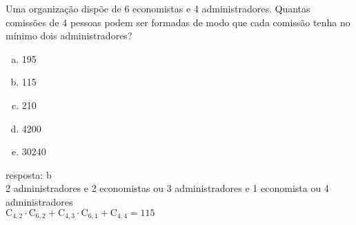 \begin{ex}
 Uma organização dispõe de 6 economistas e 4 administradores. Quantas comissões de 4 pessoas podem ser formadas de modo que cada comissão tenha no mínimo dois administradores?
    \begin{enumerate}[(a)]
    \item 195
    \item 115
    \item 210
    \item 4200
    \item 30240
    \end{enumerate}
      \begin{sol}
        resposta: b \\
        2 administradores e 2 economistas ou 3 administradores e 1 economista ou 4 administradores \\
        $\mathrm{C}_{4,2}\cdot\mathrm{C}_{6,2}+\mathrm{C}_{4,3}\cdot\mathrm{C}_{6,1}+\mathrm{C}_{4,4}=115$
      \end{sol}
\end{ex}